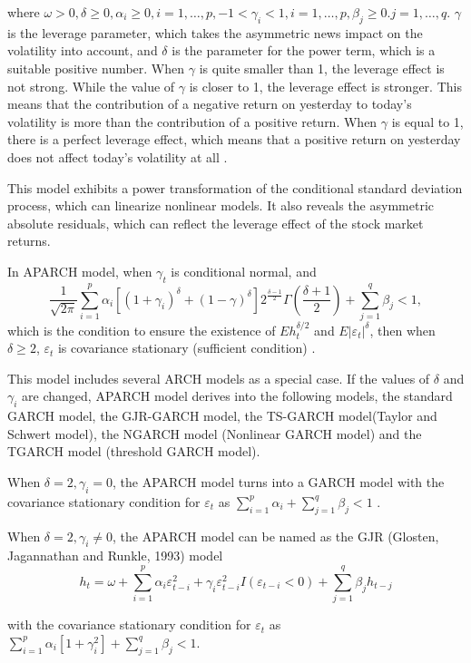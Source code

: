 where $\omega>0, \delta\geq0, \alpha_{i}\geq0, i=1, \ldots, p, -1<\gamma_{i}<1, i=1, \ldots, p, \beta_{j}\geq0.j=1, \ldots, q$. $\gamma$ is the leverage parameter, which takes the asymmetric news impact on the volatility into account,  and $\delta$ is the parameter for the power term, which is a suitable positive number. When $\gamma$ is quite smaller than 1, the leverage effect is not strong. While the value of $\gamma$  is closer to 1, the leverage effect is stronger. This means that the contribution of a negative return on yesterday to today’s volatility is more than the contribution of a positive return. When $\gamma$ is equal to 1, there is a perfect leverage effect, which means that a positive return on yesterday does not affect today’s volatility at all \citep{FengYuanhua;Sun2013}.

This model exhibits a power transformation of the conditional standard deviation process, which can linearize nonlinear models. It also reveals the asymmetric absolute residuals, which can reflect the leverage effect of the stock market returns.


In APARCH model, when $\gamma_{t}$ is conditional normal, and \[\frac{1}{\sqrt{2\pi}}\sum_{i=1}^{p}\alpha_{i} [\left(1 + \gamma_{i} \right)^\delta + (1-\gamma)^{\delta}]2^{\frac{\delta-1}{2}}\Gamma (\frac{\delta+1}{2}) + \sum_{j=1}^{q}\beta_{j}<1,\]
which is the condition to ensure the existence of $Eh_{t}^{\delta/2}$ and $E|\varepsilon_{t}|^{\delta}$, then when $\delta\geq2$, $\varepsilon_t$   is covariance stationary (sufficient condition) \citep{Ding1993}.


This model includes several ARCH models as a special case. If the values of $\delta$ and $\gamma_{i}$ are changed, APARCH model derives into the following models, the standard GARCH model, the GJR-GARCH model, the TS-GARCH model(Taylor and Schwert model), the NGARCH model (Nonlinear GARCH model) and the TGARCH model (threshold GARCH model).

When $\delta=2,\gamma_{i}=0$, the APARCH model turns into a GARCH model with the covariance stationary condition for  $\varepsilon_{t}$ as $\sum_{i=1}^{p}\alpha_{i} + \sum_{j=1}^{q}\beta_{j}<1$ \citep{Bollerslev1986}.

When $\delta = 2, \gamma_{i}\neq 0$, the APARCH model can be named as the GJR (Glosten, Jagannathan and Runkle, 1993) model 
\[h_{t}=\omega + \sum_{i=1}^{p}\alpha_{i}\varepsilon_{t-i}^{2}+\gamma_{i}\varepsilon_{t-i}^{2}I(\varepsilon_{t-i}<0)+\sum_{j=1}^{q}\beta
_{j}h_{t-j}\]

with the  covariance stationary condition for $\varepsilon_{t}$ as $\sum_{i=1}^{p}\alpha_{i}[1+\gamma_{i}^{2}]+\sum_{j=1}^{q}\beta_{j}<1$.


